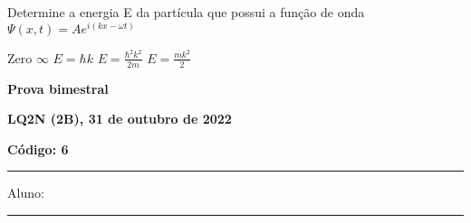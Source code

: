 \documentclass[12pt, addpoints]{exam}
\begin{document}
        \begin{questions}
\begin{multicols*}{2}
\question[20] Determine a energia E da partícula que possui a função de onda $\Psi(x,t)=Ae^{i(kx-\omega t)}$

\begin{choices}
\choice Zero \choice $\infty$ \choice $E=\hbar k$ \choice $E=\frac{\hbar^2k^2}{2m}$ \choice $E = \frac{mk^2}{2}$ \end{choices}
\end{multicols*}
\end{questions}
\newpage
        \begin{minipage}[b]{0.75\linewidth}
            \begin{flushleft}
                {\bf \large Prova bimestral}
            \end{flushleft}
            \begin{flushleft}
                {\bf \large LQ2N (2B), 31 de outubro de 2022}
            \end{flushleft}
        \end{minipage}
        \begin{minipage}[b]{0.20\linewidth}
            \begin{flushright}
                {\bf \large Código: 6}
            \end{flushright}
        \end{minipage}
        \vspace{0.5cm} \hrule \vspace{0.5cm}
        \begin{minipage}{0.75\linewidth}
            Aluno:
        \end{minipage}
        \vspace{0.5cm} \hrule \vspace{0.5cm}
\end{document}
